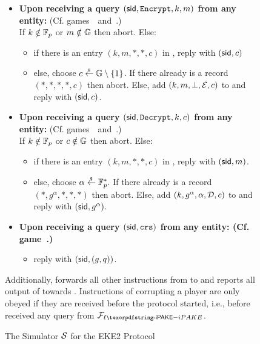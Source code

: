 \begin{figure}[ht!]
\begin{fboxenv}
\begin{minipage}{0.95\textwidth}
\begin{itemize}
      \item
        \textbf{Upon receiving a query
        $(\mathsf{sid},\texttt{Encrypt},k,m)$ from any entity:} (Cf. games~~and~.)\\
        If $k\notin\mathbb{F}_{p}$ or $m\notin\mathbb{G}$ then abort. Else:
        \begin{itemize}
          \item if there is an entry $(k,m,*,*,c)$ in \ListIC, reply with $(\mathsf{sid},c)$
          \item else, choose $c\stackrel{{}_\$}{\leftarrow}\mathbb{G}\setminus\{1\}$. If there already is a record $(*,*,*,*,c)$ then abort. Else, add $(k,m,\bot,\mathcal{E},c)$ to \ListIC and reply with $(\mathsf{sid},c)$.
        \end{itemize}
      \item
        \textbf{Upon receiving a query
        $(\mathsf{sid},\texttt{Decrypt},k,c)$ from any entity:} (Cf. games~~and~.)\\
        If $k\notin\mathbb{F}_{p}$ or $c\notin\mathbb{G}$ then abort. Else:
        \begin{itemize}
          \item if there is an entry $(k,m,*,*,c)$ in \ListIC, reply with $(\mathsf{sid},m)$.
          \item else, choose $\alpha\stackrel{{}_\$}{\leftarrow}\mathbb{F}_{p}^*$. If there already is a record $(*,g^\alpha,*,*,*)$ then abort. Else, add $(k,g^\alpha,\alpha,\mathcal{D},c)$ to \ListIC and reply with $(\mathsf{sid},g^\alpha)$.
        \end{itemize}
      \item
        \textbf{Upon receiving a query
        $(\mathsf{sid},\texttt{crs})$ from any entity: (Cf. game~.)}
        \begin{itemize}
          \item reply with $(\mathsf{sid},(g,q))$.
        \end{itemize}
      \end{itemize}
      Additionally, \Sim forwards all other instructions from \Env to \AdvA and reports all output of \AdvA towards \Env. Instructions of corrupting a player are only obeyed if they are received before the protocol started, i.e., before \Sim received any \NewSession query from $\FliPAKE$.
    \end{minipage}
  \end{fboxenv}
  \caption{The Simulator $\mathcal{S}$ for the EKE2 Protocol}\label{fig:sim-iPAKE}
\end{figure}
